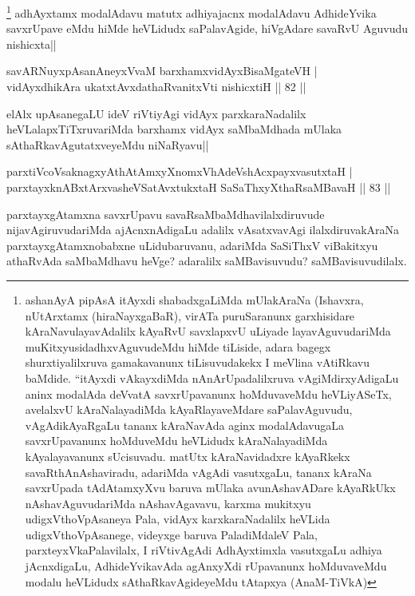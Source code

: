 \begin{artha}%
\footnote[1]{ashanAyA pipAsA itAyxdi shabadxgaLiMda mUlakAraNa (Ishavxra, nUtArxtamx (hiraNayxgaBaR), virATa puruSaranunx garxhisidare kAraNavulayavAdalilx kAyaRvU savxlapxvU uLiyade layavAguvudariMda muKitxyusidadhxvAguvudeMdu hiMde tiLiside, adara bagegx shurxtiyalilxruva gamakavanunx tiLisuvudakekx I meVlina vAtiRkavu baMdide. ``\stext itAyxdi vAkayxdiMda nAnArUpadalilxruva vAgiMdirxyAdigaLu aninx modalAda deVvatA savxrUpavanunx hoMduvaveMdu heVLiyASeTx, avelalxvU kAraNalayadiMda kAyaRlayaveMdare saPalavAguvudu, vAgAdikAyaRgaLu tananx kAraNavAda aginx modalAdavugaLa savxrUpavanunx hoMduveMdu heVLidudx kAraNalayadiMda kAyalayavanunx sUcisuvadu. matUtx kAraNavidadxre kAyaRkekx savaRthAnAshaviradu, adariMda vAgAdi vasutxgaLu, tananx kAraNa savxrUpada tAdAtamxyXvu baruva mUlaka avunAshavADare kAyaRkUkx nAshavAguvudariMda nAshavAgavavu, karxma mukitxyu udigxVthoVpAsaneya Pala, vidAyx karxkaraNadalilx heVLida udigxVthoVpAsanege, videyxge baruva PaladiMdaleV Pala, parxteyxVkaPalavilalx, I riVtivAgAdi AdhAyxtimxla vasutxgaLu adhiya jAcnxdigaLu, AdhideYvikavAda agAnxyXdi rUpavanunx hoMduvaveMdu modalu heVLidudx sAthaRkavAgideyeMdu tAtapxya (AnaM-TiVkA)} adhAyxtamx modalAdavu matutx adhiyajacnx modalAdavu AdhideYvika savxrUpave eMdu hiMde heVLidudx saPalavAgide, hiVgAdare savaRvU Aguvudu nishicxta||
\end{artha}

\begin{shl}
savARNuyxpAsanAneyxVvaM barxhamxvidAyxBisaMgateVH |\\
vidAyxdhikAra ukatxtAvxdathaRvanitxVti nishicxtiH \hfill || 82 ||
\end{shl}

\begin{artha}%
elAlx upAsanegaLU ideV riVtiyAgi vidAyx parxkaraNadalilx heVLalapxTiTxruvariMda barxhamx vidAyx saMbaMdhada mUlaka sAthaRkavAgutatxveyeMdu niNaRyavu||
\end{artha}

\begin{shl}
parxtiVcoV\s saknagxyAthAtAmxyXnomxVhAdeVshAcxpayxvasutxtaH |\\
parxtayxknABxtArxvasheVSatAvxtukxtaH SaSaThxyXthaRsaMBavaH \hfill || 83 ||
\end{shl}

\begin{artha}
parxtayxgAtamxna savxrUpavu savaRsaMbaMdhavilalxdiruvude nijavAgiruvudariMda ajAcnxnAdigaLu adalilx vAsatxvavAgi ilalxdiruvakAraNa parxtayxgAtamxnobabxne uLidubaruvanu, adariMda SaSiThxV viBakitxyu athaRvAda saMbaMdhavu heVge? adaralilx saMBavisuvudu? saMBavisuvudilalx.
\end{artha}

